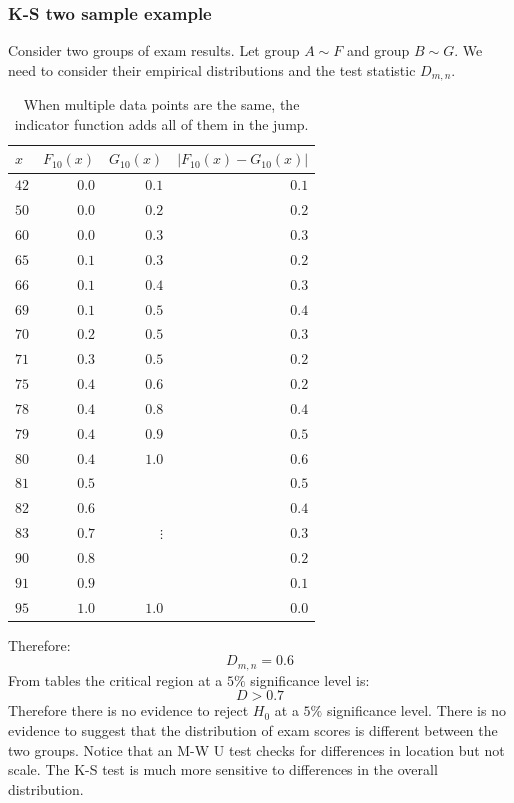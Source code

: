 \documentclass[12pt]{article}
\begin{document}
\subsubsection{K-S two sample example}
Consider two groups of exam results. Let group \(A\sim F\) and group \(B\sim G\). We need to consider their empirical distributions and the test statistic \(D_{m,n}\).
\begin{table}[H]
    \centering
    \begin{tabular}{l|rrr}
        \(x\) & \(F_{10}(x)\) & \(G_{10}(x)\) & \(|F_{10}(x)-G_{10}(x)|\)  \\ \hline
        \(42\) & \(0.0\) & \(0.1\) & \(0.1\) \\
        \(50\) & \(0.0\) & \(0.2\) & \(0.2\) \\
        \(60\) & \(0.0\) & \(0.3\) & \(0.3\) \\
        \(65\) & \(0.1\) & \(0.3\) & \(0.2\) \\
        \(66\) & \(0.1\) & \(0.4\) & \(0.3\) \\
        \(69\) & \(0.1\) & \(0.5\) & \(0.4\) \\
        \(70\) & \(0.2\) & \(0.5\) & \(0.3\) \\
        \(71\) & \(0.3\) & \(0.5\) & \(0.2\) \\
        \(75\) & \(0.4\) & \(0.6\) & \(0.2\) \\
        \(78\) & \(0.4\) & \(0.8\) & \(0.4\) \\
        \(79\) & \(0.4\) & \(0.9\) & \(0.5\) \\
        \(80\) & \(0.4\) & \(1.0\) & \(0.6\) \\
        \(81\) & \(0.5\) &  & \(0.5\) \\
        \(82\) & \(0.6\) &  & \(0.4\) \\
        \(83\) & \(0.7\) & \(\vdots\) & \(0.3\) \\
        \(90\) & \(0.8\) &  & \(0.2\) \\
        \(91\) & \(0.9\) & & \(0.1\) \\
        \(95\) & \(1.0\) & \(1.0\) & \(0.0\) \\
    \end{tabular}
    \caption{When multiple data points are the same, the indicator function adds all of them in the jump.}
\end{table}
Therefore:
\[D_{m,n}=0.6\]
From tables the critical region at a \(5\%\) significance level is:
\[D>0.7\]
Therefore there is no evidence to reject \(H_0\) at a \(5\%\) significance level. There is no evidence to suggest that the distribution of exam scores is different between the two groups. Notice that an M-W U test checks for differences in location but not scale. The K-S test is much more sensitive to differences in the overall distribution.
\clearpage
\end{document}
